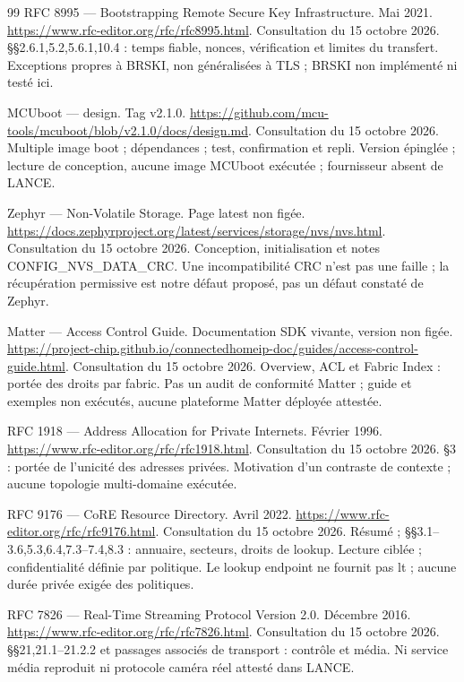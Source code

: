 \documentclass[11pt,a4paper]{article}
\begin{document}
\begin{thebibliography}{99}
 RFC 8995 --- Bootstrapping Remote Secure Key Infrastructure. Mai 2021. \url{https://www.rfc-editor.org/rfc/rfc8995.html}. Consultation du 15 octobre 2026. §§2.6.1,5.2,5.6.1,10.4 : temps fiable, nonces, vérification et limites du transfert. Exceptions propres à BRSKI, non généralisées à TLS ; BRSKI non implémenté ni testé ici.

 MCUboot --- design. Tag v2.1.0. \url{https://github.com/mcu-tools/mcuboot/blob/v2.1.0/docs/design.md}. Consultation du 15 octobre 2026. Multiple image boot ; dépendances ; test, confirmation et repli. Version épinglée ; lecture de conception, aucune image MCUboot exécutée ; fournisseur absent de LANCE.

 Zephyr --- Non-Volatile Storage. Page latest non figée. \url{https://docs.zephyrproject.org/latest/services/storage/nvs/nvs.html}. Consultation du 15 octobre 2026. Conception, initialisation et notes CONFIG\_NVS\_DATA\_CRC. Une incompatibilité CRC n'est pas une faille ; la récupération permissive est notre défaut proposé, pas un défaut constaté de Zephyr.

 Matter --- Access Control Guide. Documentation SDK vivante, version non figée. \url{https://project-chip.github.io/connectedhomeip-doc/guides/access-control-guide.html}. Consultation du 15 octobre 2026. Overview, ACL et Fabric Index : portée des droits par fabric. Pas un audit de conformité Matter ; guide et exemples non exécutés, aucune plateforme Matter déployée attestée.

 RFC 1918 --- Address Allocation for Private Internets. Février 1996. \url{https://www.rfc-editor.org/rfc/rfc1918.html}. Consultation du 15 octobre 2026. §3 : portée de l'unicité des adresses privées. Motivation d'un contraste de contexte ; aucune topologie multi-domaine exécutée.

 RFC 9176 --- CoRE Resource Directory. Avril 2022. \url{https://www.rfc-editor.org/rfc/rfc9176.html}. Consultation du 15 octobre 2026. Résumé ; §§3.1--3.6,5.3,6.4,7.3--7.4,8.3 : annuaire, secteurs, droits de lookup. Lecture ciblée ; confidentialité définie par politique. Le lookup endpoint ne fournit pas lt ; aucune durée privée exigée des politiques.

 RFC 7826 --- Real-Time Streaming Protocol Version 2.0. Décembre 2016. \url{https://www.rfc-editor.org/rfc/rfc7826.html}. Consultation du 15 octobre 2026. §§21,21.1--21.2.2 et passages associés de transport : contrôle et média. Ni service média reproduit ni protocole caméra réel attesté dans LANCE.


\end{thebibliography}
\end{document}

